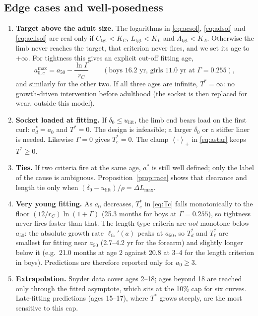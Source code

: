 \documentclass[11pt]{article}
\newcommand{\lift}{u_{\mathrm{lift}}}
\newcommand{\lfa}{\ell_{\mathrm{fa}}}
\newcommand{\tgt}{\mathrm{tgt}}
\newcommand{\pluspart}[1]{\left\langle #1 \right\rangle_{+}}
\theoremstyle{definition}
\begin{document}
\subsection{Edge cases and well-posedness}
\label{sec:edge}
\begin{enumerate}[label=\textbf{E\arabic*.},ref=E\arabic*,leftmargin=2.6em,itemsep=2pt]
\item \textbf{Target above the adult size.} The logarithms in \eqref{eq:acsol}, \eqref{eq:adsol} and \eqref{eq:aellsol} are real only if $C_\tgt<K_C$, $L_\tgt<K_L$ and $\Lambda_\tgt<K_\Lambda$. Otherwise the limb never reaches the target, that criterion never fires, and we set its age to $+\infty$. For tightness this gives an explicit cut-off fitting age,
\begin{equation}
a^{\max}_{0,c}=a_{50}-\frac{\ln\Gamma}{r_C}\qquad(\text{boys }16.2\text{ yr, girls }11.0\text{ yr at }\Gamma=0.255),
\label{eq:cutoff}
\end{equation}
and similarly for the other two. If all three ages are infinite, $T^*=\infty$: no growth-driven intervention before adulthood (the socket is then replaced for wear, outside this model).
\item \textbf{Socket loaded at fitting.} If $\delta_0\le\lift$, the limb end bears load on the first curl: $a^*_d=a_0$ and $T^*=0$. The design is infeasible; a larger $\delta_0$ or a stiffer liner is needed. Likewise $\Gamma=0$ gives $T^*_c=0$. The clamp $\pluspart{\cdot}$ in \eqref{eq:astar} keeps $T^*\ge0$.
\item \textbf{Ties.} If two criteria fire at the same age, $a^*$ is still well defined; only the label of the cause is ambiguous. Proposition~\ref{prop:race} shows that clearance and length tie only when $(\delta_0-\lift)/\rho=\Delta L_{\max}$.
\item \textbf{Very young fitting.} As $a_0$ decreases, $T^*_c$ in \eqref{eq:Tc} falls monotonically to the floor $(12/r_C)\ln(1+\Gamma)$ (25.3 months for boys at $\Gamma=0.255$), so tightness never fires faster than that. The length-type criteria are \emph{not} monotone below $a_{50}$: the absolute growth rate $\lfa'(a)$ peaks at $a_{50}$, so $T^*_d$ and $T^*_\ell$ are smallest for fitting near $a_{50}$ (2.7--4.2 yr for the forearm) and slightly longer below it (e.g.\ 21.0 months at age 2 against 20.8 at 3--4 for the length criterion in boys). Predictions are therefore reported only for $a_0\ge3$.
\item \label{ec:extrap}\textbf{Extrapolation.} Snyder data cover ages 2--18; ages beyond 18 are reached only through the fitted asymptote, which sits at the 10\% cap for six curves. Late-fitting predictions (ages 15--17), where $T^*$ grows steeply, are the most sensitive to this cap.

\end{enumerate}
\end{document}
